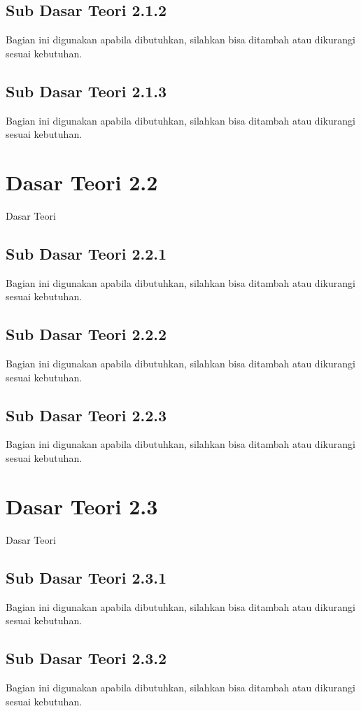 \subsection{Sub Dasar Teori 2.1.2}
Bagian ini digunakan apabila dibutuhkan, silahkan bisa ditambah atau dikurangi sesuai kebutuhan.

\subsection{Sub Dasar Teori 2.1.3}
Bagian ini digunakan apabila dibutuhkan, silahkan bisa ditambah atau dikurangi sesuai kebutuhan.

\section{Dasar Teori 2.2}
Dasar Teori

\subsection{Sub Dasar Teori 2.2.1}
Bagian ini digunakan apabila dibutuhkan, silahkan bisa ditambah atau dikurangi sesuai kebutuhan.

\subsection{Sub Dasar Teori 2.2.2}
Bagian ini digunakan apabila dibutuhkan, silahkan bisa ditambah atau dikurangi sesuai kebutuhan.

\subsection{Sub Dasar Teori 2.2.3}
Bagian ini digunakan apabila dibutuhkan, silahkan bisa ditambah atau dikurangi sesuai kebutuhan.

\section{Dasar Teori 2.3}
Dasar Teori

\subsection{Sub Dasar Teori 2.3.1}
Bagian ini digunakan apabila dibutuhkan, silahkan bisa ditambah atau dikurangi sesuai kebutuhan.

\subsection{Sub Dasar Teori 2.3.2}
Bagian ini digunakan apabila dibutuhkan, silahkan bisa ditambah atau dikurangi sesuai kebutuhan.

